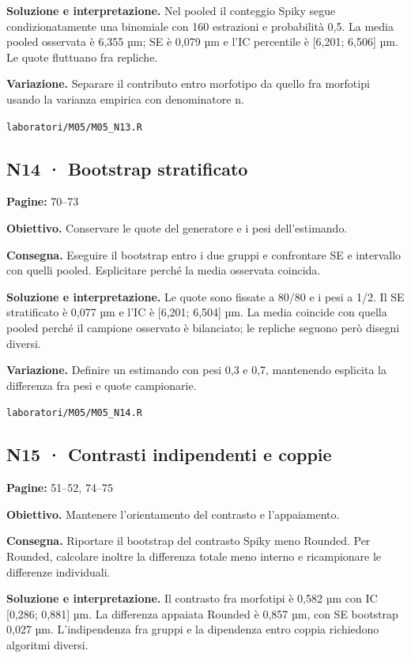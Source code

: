 \documentclass[11pt,a4paper]{article}
\begin{document}
\textbf{Soluzione e interpretazione.} Nel pooled il conteggio Spiky segue condizionatamente una binomiale con 160 estrazioni e probabilità 0,5. La media pooled osservata è 6,355 µm; SE è 0,079 µm e l’IC percentile è [6,201; 6,506] µm. Le quote fluttuano fra repliche.

\textbf{Variazione.} Separare il contributo entro morfotipo da quello fra morfotipi usando la varianza empirica con denominatore n.

\texttt{laboratori/M05/M05\_N13.R}

\subsection*{N14 · Bootstrap stratificato}

\textbf{Pagine:} 70–73

\textbf{Obiettivo.} Conservare le quote del generatore e i pesi dell’estimando.

\textbf{Consegna.} Eseguire il bootstrap entro i due gruppi e confrontare SE e intervallo con quelli pooled. Esplicitare perché la media osservata coincida.

\textbf{Soluzione e interpretazione.} Le quote sono fissate a 80/80 e i pesi a 1/2. Il SE stratificato è 0,077 µm e l’IC è [6,201; 6,504] µm. La media coincide con quella pooled perché il campione osservato è bilanciato; le repliche seguono però disegni diversi.

\textbf{Variazione.} Definire un estimando con pesi 0,3 e 0,7, mantenendo esplicita la differenza fra pesi e quote campionarie.

\texttt{laboratori/M05/M05\_N14.R}

\newpage

\subsection*{N15 · Contrasti indipendenti e coppie}

\textbf{Pagine:} 51–52, 74–75

\textbf{Obiettivo.} Mantenere l’orientamento del contrasto e l’appaiamento.

\textbf{Consegna.} Riportare il bootstrap del contrasto Spiky meno Rounded. Per Rounded, calcolare inoltre la differenza totale meno interno e ricampionare le differenze individuali.

\textbf{Soluzione e interpretazione.} Il contrasto fra morfotipi è 0,582 µm con IC [0,286; 0,881] µm. La differenza appaiata Rounded è 0,857 µm, con SE bootstrap 0,027 µm. L’indipendenza fra gruppi e la dipendenza entro coppia richiedono algoritmi diversi.
\end{document}
